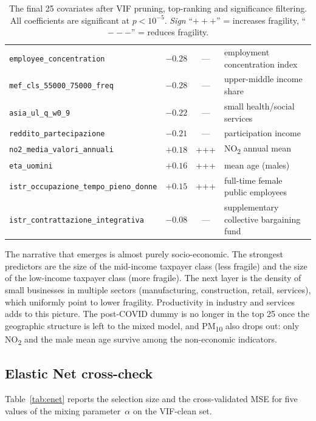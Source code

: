 \documentclass[11pt,a4paper]{article}
\begin{document}
\begin{table}[h!]
\begin{tabular}{lcc l}
    \texttt{employee\_concentration}                & $-0.28$ & --- & employment concentration index\\
    \texttt{mef\_cls\_55000\_75000\_freq}           & $-0.28$ & --- & upper-middle income share\\
    \texttt{asia\_ul\_q\_w0\_9}                     & $-0.22$ & --- & small health/social services\\
    \texttt{reddito\_partecipazione}                & $-0.21$ & --- & participation income\\
    \texttt{no2\_media\_valori\_annuali}            & $+0.18$ & +++ & NO\textsubscript{2} annual mean\\
    \texttt{eta\_uomini}                            & $+0.16$ & +++ & mean age (males)\\
    \texttt{istr\_occupazione\_tempo\_pieno\_donne} & $+0.15$ & +++ & full-time female public employees\\
    \texttt{istr\_contrattazione\_integrativa}      & $-0.08$ & --- & supplementary collective bargaining fund\\
    \bottomrule
  \end{tabular}
  \caption{The final 25 covariates after VIF pruning, top-ranking
    and significance filtering. All coefficients are significant at
    $p < 10^{-5}$. \emph{Sign} ``$+++$'' = increases fragility,
    ``$---$'' = reduces fragility.}
  \label{tab:final25}
\end{table}

The narrative that emerges is almost purely socio-economic. The
strongest predictors are the size of the mid-income taxpayer class
(less fragile) and the size of the low-income taxpayer class (more
fragile). The next layer is the density of small businesses in
multiple sectors (manufacturing, construction, retail, services),
which uniformly point to lower fragility. Productivity in industry
and services adds to this picture. The post-COVID dummy is no longer
in the top 25 once the geographic structure is left to the mixed
model, and PM\textsubscript{10} also drops out: only NO\textsubscript{2}
and the male mean age survive among the non-economic indicators.

\subsection{Elastic Net cross-check}

Table~\ref{tab:enet} reports the selection size and the
cross-validated MSE for five values of the mixing parameter~$\alpha$
on the VIF-clean set.
\end{document}
